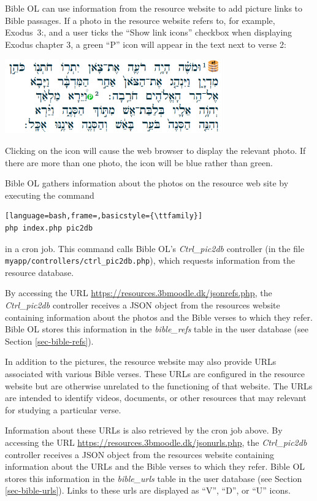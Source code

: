 \documentclass[11pt,oneside,a4paper]{memoir}
\newcommand*{\bibleref}[3]{#1~#2\thinspace:\thinspace#3}
\begin{document}
Bible OL can use information from the resource website to add picture links to Bible passages. If a
photo in the resource website refers to, for example, \bibleref{Exodus}{3}{2}, and a user ticks the
``Show link icons'' checkbox when displaying Exodus chapter 3, a green ``P'' icon will appear in the
text next to verse 2:

\begin{center}
\includegraphics[width=0.7\textwidth]{exodus3.png}
\end{center}

Clicking on the icon will cause the web browser to display the relevant photo. If there are more
than one photo, the icon will be blue rather than green.

Bible OL gathers information about the photos on the resource web site by executing the command

\begin{lstlisting}[language=bash,frame=,basicstyle={\ttfamily}]
php index.php pic2db
\end{lstlisting}

\noindent
in a cron job. This command calls Bible OL's \emph{Ctrl\_pic2db} controller (in the file
\texttt{myapp/\allowbreak{}controllers/\allowbreak{}ctrl\_pic2db.php}), which requests information from the resource database.

By accessing the URL \url{https://resources.3bmoodle.dk/jsonrefs.php}, the \emph{Ctrl\_pic2db}
controller receives a JSON object from the resources website containing information about the photos
and the Bible verses to which they refer. Bible OL stores this information in the
\emph{bible\_refs} table in the user database (see Section
\ref{sec-bible-refs}).

In addition to the pictures, the resource website may also provide URLs associated with various
Bible verses. These URLs are configured in the resource website but are otherwise unrelated to the
functioning of that website. The URLs are intended to identify videos, documents, or other resources
that may relevant for studying a particular verse.

Information about these URLs is also retrieved by the cron job above. By accessing the URL
\url{https://resources.3bmoodle.dk/jsonurls.php}, the \emph{Ctrl\_pic2db} controller receives a JSON
object from the resources website containing information about the URLs and the Bible verses to
which they refer. Bible OL stores this information in the \emph{bible\_urls}%
table in the user database (see Section \ref{sec-bible-urls}). Links to these
urls are displayed as ``V'', ``D'', or ``U'' icons.
\end{document}
